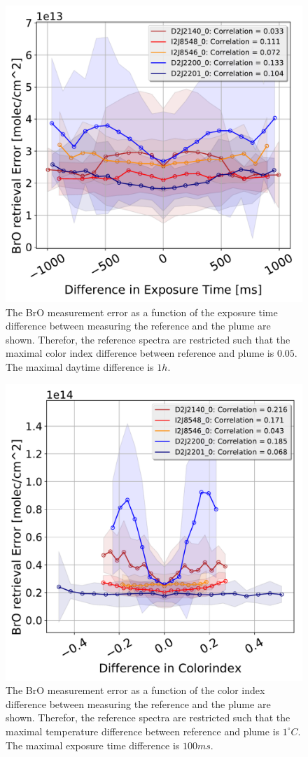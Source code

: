 \documentclass  [
  paper    = a4,
  BCOR     = 10mm,
  twoside,
  fontsize = 12pt,
  fleqn,
  toc      = bibnumbered,
  toc      = listofnumbered,
  numbers  = noendperiod,
  headings = normal,
  listof   = leveldown,
  version  = 3.03
]                                       {scrreprt}
\begin{document}
\begin{figure}[h]
	\centering
	\includegraphics[width=0.7\linewidth]{Bilder/BrOErr_OhnEVar/DiffExpTimewithoutOtherparamallInstruments}
	\caption{The BrO measurement error as a function of the exposure time difference between measuring the reference and the plume are shown. Therefor, the reference spectra are restricted such that the maximal color index difference between reference and plume is $0.05$. The maximal daytime difference is $1h$.}
	\label{fig:diffexptimewithoutotherparamallinstruments}
\end{figure}
\begin{figure}[h]
	\centering
	\includegraphics[width=0.7\linewidth]{Bilder/BrOErr_OhnEVar/DiffColidxwithoutOtherparamallInstruments}
	\caption{The BrO measurement error as a function of the color index difference between measuring the reference and the plume are shown. Therefor, the reference spectra are restricted such that the maximal temperature difference between reference and plume is $1^\circ C$. The maximal exposure time difference is $100 ms$.}
	\label{fig:diffcolidxwithoutotherparamallinstruments}
\end{figure}
\end{document}
